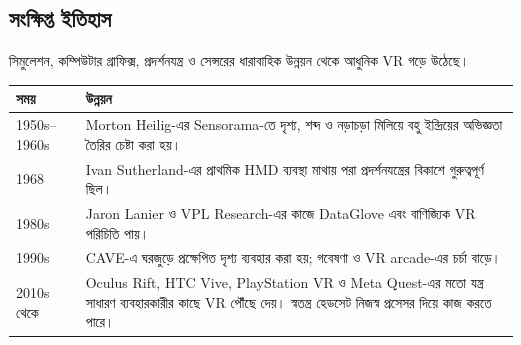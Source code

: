 \begin{topicbody}
\subsection{সংক্ষিপ্ত ইতিহাস}
সিমুলেশন, কম্পিউটার গ্রাফিক্স, প্রদর্শনযন্ত্র ও সেন্সরের ধারাবাহিক উন্নয়ন থেকে আধুনিক VR গড়ে উঠেছে।
\begin{compacttable}
\begin{tabular}{|p{}|p{}|}
\hline\textbf{সময়} & \textbf{উন্নয়ন}\\\hline
1950s--1960s & Morton Heilig-এর Sensorama-তে দৃশ্য, শব্দ ও নড়াচড়া মিলিয়ে বহু ইন্দ্রিয়ের অভিজ্ঞতা তৈরির চেষ্টা করা হয়।\\\hline
1968 & Ivan Sutherland-এর প্রাথমিক HMD ব্যবস্থা মাথায় পরা প্রদর্শনযন্ত্রের বিকাশে গুরুত্বপূর্ণ ছিল।\\\hline
1980s & Jaron Lanier ও VPL Research-এর কাজে DataGlove এবং বাণিজ্যিক VR পরিচিতি পায়।\\\hline
1990s & CAVE-এ ঘরজুড়ে প্রক্ষেপিত দৃশ্য ব্যবহার করা হয়; গবেষণা ও VR arcade-এর চর্চা বাড়ে।\\\hline
2010s থেকে & Oculus Rift, HTC Vive, PlayStation VR ও Meta Quest-এর মতো যন্ত্র সাধারণ ব্যবহারকারীর কাছে VR পৌঁছে দেয়। স্বতন্ত্র হেডসেট নিজস্ব প্রসেসর দিয়ে কাজ করতে পারে।\\\hline
\end{tabular}
\end{compacttable}

\end{topicbody}
